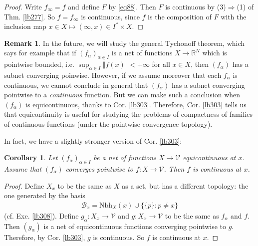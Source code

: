 \documentclass[12pt,b5paper,notitlepage]{article}
\theoremstyle{definition}
\newtheorem{rem}[df]{Remark}
\theoremstyle{plain}
\newtheorem{co}[df]{Corollary}
\newcommand{\mc}{\mathcal}
\newcommand{\Rbb}{\mathbb R}
\newcommand{\Nbh}{\mathrm{Nbh}}
\numberwithin{equation}{section}
\begin{document}
\begin{proof}
Write $f_\infty=f$ and define $F$ by \eqref{eq88}. Then $F$ is continuous by (3)$\Rightarrow$(1) of Thm. \ref{lb277}. So $f=f_\infty$ is continuous, since $f$ is the composition of $F$ with the inclusion map $x\in X\mapsto (\infty,x)\in I^*\times X$.
\end{proof}






\begin{rem}\label{lb304}
In the future, we will study the general Tychonoff theorem, which says for example that if $(f_\alpha)_{\alpha\in I}$ is a net of functions $X\rightarrow\Rbb^N$ which is pointwise bounded, i.e. $\sup_{\alpha\in I}\Vert f(x)\Vert<+\infty$ for all $x\in X$, then $(f_\alpha)$ has a subnet converging poinwise. However, if we assume moreover that each $f_\alpha$ is continuous, we cannot conclude in general that $(f_\alpha)$ has a subnet converging pointwise to a \textit{continuous} function. But we can make such a conclusion when $(f_\alpha)$ is equicontinuous, thanks to Cor. \ref{lb303}. Therefore, Cor. \ref{lb303} tells us that equicontinuity is useful for studying the problems of compactness of families of continuous functions (under the pointwise convergence topology).
\end{rem}


In fact, we have a slightly stronger version of Cor. \ref{lb303}:

\begin{co}\label{lb310}
Let $(f_\alpha)_{\alpha\in I}$ be a net of functions $X\rightarrow\mc V$ equicontinuous at $x$. Assume that $(f_\alpha)$ converges pointwise to $f:X\rightarrow\mc V$. Then $f$ is continuous at $x$.
\end{co}

\begin{proof}
Define $X_x$ to be the same as $X$ as a set, but has a different topology: the one generated by the basis
\begin{align*}
\mc B_x=\Nbh_X(x)\cup\big\{\{p\}:p\neq x\big\}
\end{align*}
(cf. Exe. \ref{lb308}). Define $g_\alpha:X_x\rightarrow\mc V$ and $g:X_x\rightarrow\mc V$ to be the same as $f_\alpha$ and $f$. Then $(g_\alpha)$ is a net of equicontinuous functions converging pointwise to $g$. Therefore, by Cor. \ref{lb303}, $g$ is continuous. So $f$ is continuous at $x$. 
\end{proof}
\end{document}
